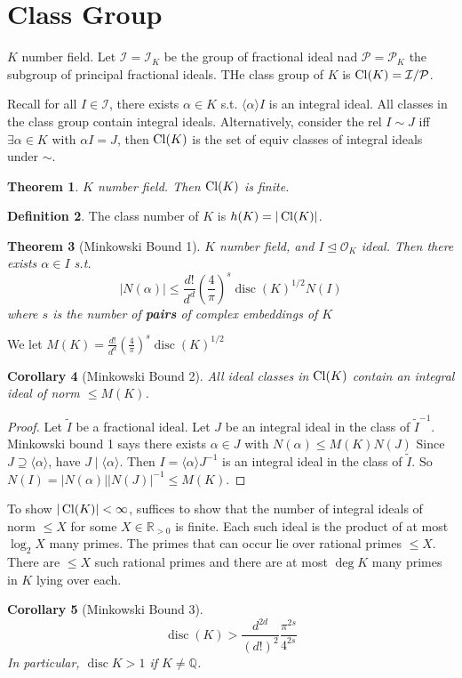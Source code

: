 \documentclass{article}
\theoremstyle{definition}
\newtheorem{defn}{Definition}[section]
\theoremstyle{remark}
\theoremstyle{plain}
\newtheorem{thm}[defn]{Theorem}
\newtheorem{crly}[defn]{Corollary}
\newcommand{\QQ}{\mathbb{Q}}
\newcommand{\RR}{\mathbb{R}}
\newcommand{\disc}{\operatorname{disc}}
\begin{document}
\section{Class Group}
$K$ number field. Let $\mathcal I=\mathcal I_K$ be the group of fractional ideal nad $\mathcal P=\mathcal P_K$ the subgroup of principal fractional ideals. THe class group of $K$ is $\operatorname{Cl}(K)=\mathcal I/\mathcal P$.

Recall for all $I\in\mathcal I$, there exists $\alpha\in K$ s.t. $\langle\alpha\rangle I$ is an integral ideal. All classes in the class group contain integral ideals.
Alternatively, consider the rel $I\sim J$ iff $\exists \alpha\in K$ with $\alpha I=J$, then $\operatorname{Cl}(K)$ is the set of equiv classes of integral ideals under $\sim$.
\begin{thm}
    $K$ number field. Then $\operatorname{Cl}(K)$ is finite.
\end{thm}
\begin{defn}
    The class number of $K$ is $h(K)=|\operatorname{Cl}(K)|$.
\end{defn}
\begin{thm}[Minkowski Bound 1]
    $K$ number field, and $I\trianglelefteq\mathcal O_K$ ideal. Then there exists $\alpha\in I$ s.t. \[|N(\alpha)|\le\frac{d!}{d^d}\left(\frac{4}{\pi}\right)^s\disc(K)^{1/2}N(I)\] where $s$ is the number of \textbf{pairs} of complex embeddings of $K$
\end{thm}
We let $M(K)=\frac{d!}{d^d}(\frac{4}{\pi})^s\disc(K)^{1/2}$
\begin{crly}[Minkowski Bound 2]
    All ideal classes in $\operatorname{Cl}(K)$ contain an integral ideal of norm $\le M(K)$.
\end{crly}
\begin{proof}
    Let $\tilde I$ be a fractional ideal. Let $J$ be an integral ideal in the class of $\tilde I^{-1}$. Minkowski bound 1 says there exists $\alpha\in J$ with $N(\alpha)\le M(K)N(J)$ Since $J\supseteq \langle\alpha\rangle$, have $J\mid\langle\alpha\rangle$. Then $I=\langle\alpha\rangle J^{-1}$ is an integral ideal in the class of $\tilde I$. So $N(I)=|N(\alpha)||N(J)|^{-1}\le M(K)$.
\end{proof}
To show $|\operatorname{Cl}(K)|<\infty$, suffices to show that the number of integral ideals of norm $\le X$ for some $X\in\RR_{>0}$ is finite. Each such ideal is the product of at most $\log_2X$ many primes. The primes that can occur lie over rational primes $\le X$. There are $\le X$ such rational primes and there are at most $\deg K$ many primes in $K$ lying over each.
\begin{crly}[Minkowski Bound 3]
    \[\disc(K)>\frac{d^{2d}}{(d!)^2}\dfrac{\pi^{2s}}{4^{2s}}\]
    In particular, $\disc K>1$ if $K\neq \QQ$.
\end{crly}
\end{document}
